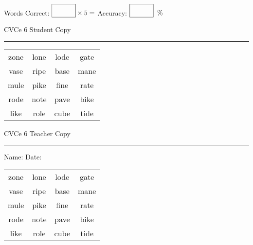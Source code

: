 \documentclass{memoir}
\begin{document}
\small

Words Correct: $\fbox{\phantom{\huge 100}} \times 5 = $ Accuracy: $\fbox{\phantom{\huge 100}}\;\; \%$ 

\vfill

\newpage


\footnotesize \noindent
CVCe 6 \hfill Student Copy
\smallskip
\hrule

\Large

\setlength{\tabcolsep}{14pt}
\def\arraystretch{2}

{\selectfont


\begin{vplace}[0.5]
\begin{center}
\begin{tabular}{cccc}
zone & lone & lode & gate \\
vase & ripe & base & mane \\
mule & pike & fine & rate \\
rode & note & pave & bike \\
like & role & cube & tide \\
\end{tabular}
\end{center}
\end{vplace}

}

\newpage

\footnotesize \noindent
CVCe 6 \hfill Teacher Copy
\smallskip
\hrule

\small

\vfill

\noindent
Name: \underline{\hspace{1.75in}} \hfill Date: \underline{\hspace{1in}}

\Large

{\selectfont


\begin{vplace}[0.5]
\begin{center}
\begin{tabular}{cccc}
zone & lone & lode & gate \\
vase & ripe & base & mane \\
mule & pike & fine & rate \\
rode & note & pave & bike \\
like & role & cube & tide \\
\end{tabular}
\end{center}
\end{vplace}



}
\end{document}
